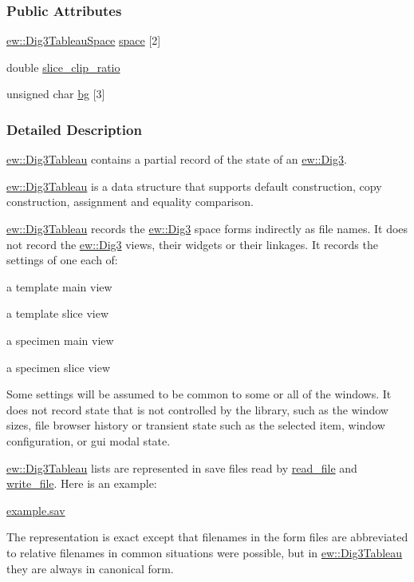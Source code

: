 \subsubsection*{Public Attributes}
\begin{DoxyCompactItemize}
\item 
\hyperlink{classew_1_1Dig3TableauSpace}{ew::Dig3TableauSpace} \hyperlink{classew_1_1Dig3Tableau_a1b990b9b496c362b4163a524495991e8}{space} \mbox{[}2\mbox{]}
\item 
double \hyperlink{classew_1_1Dig3Tableau_abf30abc4fcb077a98b911b66136ed29e}{slice\_\-clip\_\-ratio}
\item 
unsigned char \hyperlink{classew_1_1Dig3Tableau_ade125d58d73182b82eecad5ff22f7008}{bg} \mbox{[}3\mbox{]}
\end{DoxyCompactItemize}


\subsubsection{Detailed Description}
\hyperlink{classew_1_1Dig3Tableau}{ew::Dig3Tableau} contains a partial record of the state of an \hyperlink{classew_1_1Dig3}{ew::Dig3}.

\hyperlink{classew_1_1Dig3Tableau}{ew::Dig3Tableau} is a data structure that supports default construction, copy construction, assignment and equality comparison.

\hyperlink{classew_1_1Dig3Tableau}{ew::Dig3Tableau} records the \hyperlink{classew_1_1Dig3}{ew::Dig3} space forms indirectly as file names. It does not record the \hyperlink{classew_1_1Dig3}{ew::Dig3} views, their widgets or their linkages. It records the settings of one each of:
\begin{DoxyItemize}
\item a template main view
\item a template slice view
\item a specimen main view
\item a specimen slice view
\end{DoxyItemize}Some settings will be assumed to be common to some or all of the windows. It does not record state that is not controlled by the library, such as the window sizes, file browser history or transient state such as the selected item, window configuration, or gui modal state.

\hyperlink{classew_1_1Dig3Tableau}{ew::Dig3Tableau} lists are represented in save files read by \hyperlink{classew_1_1Dig3Tableau_ac74f443090f0591aed7b3934e69fdb80}{read\_\-file} and \hyperlink{classew_1_1Dig3Tableau_ab8a6e764e4145174c813511b38784800}{write\_\-file}. Here is an example:
\begin{DoxyItemize}
\item \hyperlink{example_8sav}{example.sav}
\end{DoxyItemize}The representation is exact except that filenames in the form files are abbreviated to relative filenames in common situations were possible, but in \hyperlink{classew_1_1Dig3Tableau}{ew::Dig3Tableau} they are always in canonical form. 

